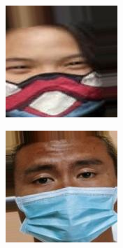 \documentclass{cubeamer}
\begin{document}
\begin{frame}
\begin{minipage}{.49\textwidth}
\begin{figure}
	\begin{subfigure}{.45\textwidth}
		\centering
		\includegraphics[width=.8\linewidth]{img/am1.jpg}  
	\end{subfigure}
	\begin{subfigure}{.45\textwidth}
		\centering
		\includegraphics[width=.8\linewidth]{img/am2.jpg}  
	\end{subfigure}
	

\end{figure}
\end{minipage}
\end{frame}
\end{document}
